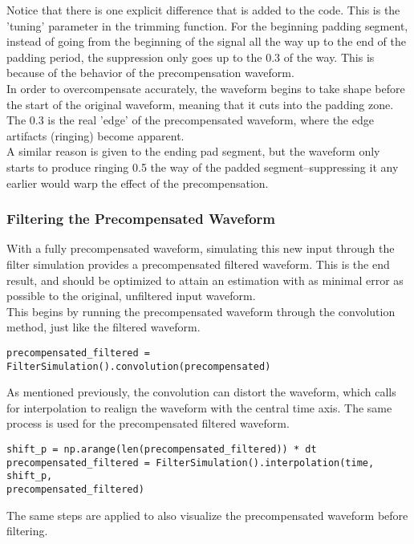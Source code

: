 Notice that there is one explicit difference that is added to the code. This is the 'tuning' parameter in the trimming function. For the beginning padding segment, instead of going from the beginning of the signal all the way up to the end of the padding period, the suppression only goes up to the 0.3 of the way. This is because of the behavior of the precompensation waveform.
\\
In order to overcompensate accurately, the waveform begins to take shape before the start of the original waveform, meaning that it cuts into the padding zone. The 0.3 is the real 'edge' of the precompensated waveform, where the edge artifacts (ringing) become apparent.
\\
A similar reason is given to the ending pad segment, but the waveform only starts to produce ringing 0.5 the way of the padded segment--suppressing it any earlier would warp the effect of the precompensation.

\subsubsection{Filtering the Precompensated Waveform}

With a fully precompensated waveform, simulating this new input through the filter simulation provides a precompensated filtered waveform. This is the end result, and should be optimized to attain an estimation with as minimal error as possible to the original, unfiltered input waveform.
\\
This begins by running the precompensated waveform through the convolution method, just like the filtered waveform.

\begin{verbatim}
precompensated_filtered = FilterSimulation().convolution(precompensated)
\end{verbatim}

As mentioned previously, the convolution can distort the waveform, which calls for interpolation to realign the waveform with the central time axis. The same process is used for the precompensated filtered waveform.
\begin{verbatim}
shift_p = np.arange(len(precompensated_filtered)) * dt
precompensated_filtered = FilterSimulation().interpolation(time, shift_p,
precompensated_filtered)
\end{verbatim}

The same steps are applied to also visualize the precompensated waveform before filtering.

